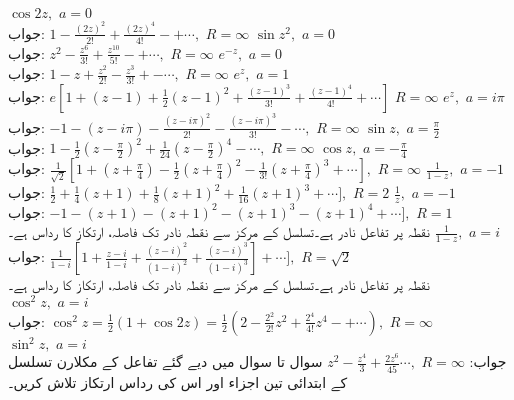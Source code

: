 \quad
$\cos 2z,\,\, a=0$\\
جواب:\quad
$1-\tfrac{(2z)^2}{2!}+\tfrac{(2z)^4}{4!}-+\cdots, \,\, R=\infty$
\quad
$\sin z^2,\,\, a=0$\\
جواب:\quad
$z^2-\tfrac{z^6}{3!}+\tfrac{z^{10}}{5!}-+\cdots,\,\, R=\infty$
\quad
$e^{-z},\,\, a=0$\\
جواب:\quad
$1-z+\tfrac{z^2}{2!}-\tfrac{z^3}{3!}+-\cdots,\,\, R=\infty$
\quad
$e^z,\,\, a=1$\\
جواب:\quad
$e[1+(z-1)+\tfrac{1}{2}(z-1)^2+\tfrac{(z-1)^3}{3!}+\tfrac{(z-1)^4}{4!}+\cdots]\,\, R=\infty$
\quad
$e^z,\,\, a=i\pi$\\
جواب:\quad
$-1-(z-i\pi)-\tfrac{(z-i\pi)^2}{2!}-\tfrac{(z-i\pi)^3}{3!}-\cdots,\,\,R=\infty$
\quad
$\sin z,\,\, a=\tfrac{\pi}{2}$\\
جواب:\quad
$1-\tfrac{1}{2}(z-\tfrac{\pi}{2})^2+\tfrac{1}{24}(z-\tfrac{\pi}{2})^4-\cdots,\,\,R=\infty$
\quad
$\cos z,\,\, a=-\tfrac{\pi}{4}$\\
جواب:\quad
$\tfrac{1}{\sqrt{2}}[1+(z+\tfrac{\pi}{4})-\tfrac{1}{2}(z+\tfrac{\pi}{4})^2-\tfrac{1}{3!}(z+\tfrac{\pi}{4})^3+\cdots],\,\,R=\infty$
\quad
$\tfrac{1}{1-z},\,\, a=-1$\\
جواب:\quad
$\tfrac{1}{2}+\tfrac{1}{4}(z+1)+\tfrac{1}{8}(z+1)^2+\tfrac{1}{16}(z+1)^3+\cdots],\,\,R=2$
\quad
$\tfrac{1}{z},\,\, a=-1$\\
جواب:\quad
$-1-(z+1)-(z+1)^2-(z+1)^3-(z+1)^4+\cdots],\,\,R=1$\\
نقطہ  پر تفاعل  نادر ہے۔تسلسل کے مرکز  سے نقطہ نادر تک فاصلہ، ارتکاز کا رداس   ہے۔ 
\quad
$\tfrac{1}{1-z},\,\, a=i$\\
جواب:\quad
$\tfrac{1}{1-i}[1+\tfrac{z-i}{1-i}+\tfrac{(z-i)^2}{(1-i)^2}+\tfrac{(z-i)^3}{(1-i)^3}]+\cdots],\,\,R=\sqrt{2}$\\
نقطہ  پر تفاعل  نادر ہے۔تسلسل کے مرکز  سے نقطہ نادر تک فاصلہ، ارتکاز کا رداس   ہے۔
\quad
$\cos^2 z,\,\, a=i$\\
جواب:\quad
$\cos^2 z=\tfrac{1}{2}(1+\cos 2z)=\tfrac{1}{2}(2-\tfrac{2^2}{2!}z^2+\tfrac{2^4}{4!}z^4-+\cdots),\,\,R=\infty$
\quad
$\sin^2 z,\,\, a=i$\\
جواب:\quad
$z^2-\tfrac{z^4}{3}+\tfrac{2z^6}{45}\cdots,\,\,R=\infty$
سوال  تا سوال  میں دیے گئے تفاعل کے مکلارن تسلسل کے ابتدائی تین اجزاء  اور اس کی رداس ارتکاز تلاش کریں۔

